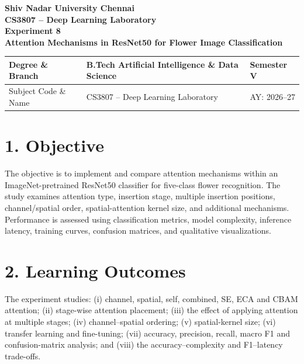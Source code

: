 \documentclass[10pt]{article}
\begin{document}
\begin{center}
{\large\textbf{Shiv Nadar University Chennai}}\\[2mm]
{\normalsize\textbf{CS3807 -- Deep Learning Laboratory}}\\[2mm]
{\large\textbf{Experiment 8}}\\[1mm]
{\normalsize\textbf{Attention Mechanisms in ResNet50 for Flower Image Classification}}
\end{center}
\vspace{3mm}
\begin{tabular}{|p{3.4cm}|p{9.0cm}|p{1.4cm}|}\hline
Degree \& Branch & B.Tech Artificial Intelligence \& Data Science & Semester V\\\hline
Subject Code \& Name & CS3807 -- Deep Learning Laboratory & AY: 2026--27\\\hline
\end{tabular}

\section*{1. Objective}
The objective is to implement and compare attention mechanisms within an ImageNet-pretrained ResNet50 classifier for five-class flower recognition. The study examines attention type, insertion stage, multiple insertion positions, channel/spatial order, spatial-attention kernel size, and additional mechanisms. Performance is assessed using classification metrics, model complexity, inference latency, training curves, confusion matrices, and qualitative visualizations.

\section*{2. Learning Outcomes}
The experiment studies: (i) channel, spatial, self, combined, SE, ECA and CBAM attention; (ii) stage-wise attention placement; (iii) the effect of applying attention at multiple stages; (iv) channel--spatial ordering; (v) spatial-kernel size; (vi) transfer learning and fine-tuning; (vii) accuracy, precision, recall, macro F1 and confusion-matrix analysis; and (viii) the accuracy--complexity and F1--latency trade-offs.
\end{document}
